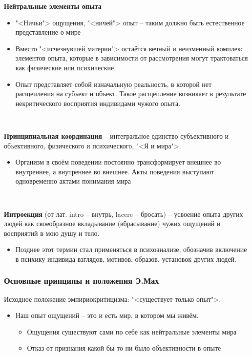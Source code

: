 \documentclass[main.tex]{subfiles}
\begin{document}
{\parindent0pt
\textbf{Нейтральные элементы опыта}
\begin{itemize}[nosep,leftmargin=0.5cm]
\item "<Ничьи"> ощущения, "<ничей"> опыт -- таким должно быть естественное представление о мире
\item Вместо "<исчезнувшей материи"> остаётся вечный и неизменный комплекс элементов опыта, которые в зависимости от рассмотрения могут трактоваться как физические или психические.
\item Опыт представляет собой изначальную реальность, в которой нет расщепления на субъект и объект.
Такое расщепление возникает в результате некритического восприятия индивидами чужого опыта.
\end{itemize}
}
\ 

{\parindent0pt
\textbf{Принципиальная координация} -- интегральное единство субъективного и объективного, физического и психического, "<Я и мира">.
\begin{itemize}[nosep,leftmargin=0.5cm]
\item Организм в своём поведении постоянно трансформирует внешнее во внутреннее, а внутреннее во внешнее.
Акты поведения выступают одновременно актами понимания мира
\end{itemize}
}
\ 

{\parindent0pt
\textbf{Интроекция} (от лат. intro -- внутрь, lacere -- бросать) -- усвоение опыта других людей как своеобразное вкладывание (вбрасывание) чужих ощущений и восприятий в мою душу и тело.
\begin{itemize}[nosep,leftmargin=0.5cm]
\item Позднее этот термин стал применяться в психоанализе, обозначив включение в психику индивида взглядов, мотивов, образов, установок других людей.
\end{itemize}
}



\subsubsection{Основные принципы и положения Э.Мах}

{\parindent0pt
Исходное положение эмпириокритицизма: "<существует только опыт">.
\begin{itemize}[nosep,leftmargin=0.5cm]
\item Наш опыт ощущений -- это и есть мир, в котором мы живём.
\begin{itemize}[nosep,leftmargin=0.6cm]
\item Ощущения существуют сами по себе как нейтральные элементы мира
\item Отказ от признания какой бы то ни было объективности в опыте
\end{itemize}
\end{itemize}
}
\ 
\end{document}
